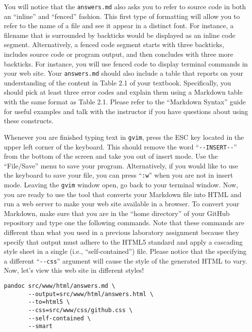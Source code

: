 \documentclass[11pt]{article}
\newcommand{\mainprogram}{\lstinline{answers.md}}
\newcommand{\command}[1]{``\lstinline{#1}''}
\newcommand{\program}[1]{\lstinline{#1}}
\newcommand{\option}[1]{``{#1}''}
\begin{document}
You will notice that the \mainprogram{} also asks you to refer to source code
in both an ``inline'' and ``fenced'' fashion. This first type of formatting
will allow you to refer to the name of a file and see it appear in a distinct
font. For instance, a filename that is surrounded by backticks would be
displayed as an inline code segment. Alternatively, a fenced code segment
starts with three backticks, includes source code or program output, and then
concludes with three more backticks. For instance, you will use fenced code to
display terminal commands in your web site. Your \mainprogram{} should also
include a table that reports on your understanding of the content in Table 2.1
of your textbook. Specifically, you should pick at least three error codes and
explain them using a Markdown table with the same format as Table 2.1. Please
refer to the ``Markdown Syntax'' guide for useful examples and talk with the
instructor if you have questions about using these constructs.

Whenever you are finished typing text in \program{gvim}, press the ESC key
located in the upper left corner of the keyboard. This should remove the word
\command{--INSERT--} from the bottom of the screen and take you out of insert
mode. Use the \option{File/Save} menu to save your program. Alternatively, if
you would like to use the keyboard to save your file, you can press
\command{:w} when you are not in insert mode. Leaving the {\tt gvim} window
open, go back to your terminal window. Now, you are ready to use the tool that
converts your Markdown file into HTML and run a web server to make your web
site available in a browser. To convert your Markdown, make sure that you are
in the ``home directory'' of your GitHub repository and type one the following
commands. Note that these commands are different than what you used in a
previous laboratory assignment because they specify that output must adhere to
the HTML5 standard and apply a cascading style sheet in a single (i.e.,
``self-contained'') file. Please notice that the specifying a different
\command{--css} argument will cause the style of the generated HTML to vary.
Now, let's view this web site in different styles!

\vspace*{-.05in}

\begin{verbatim}
pandoc src/www/html/answers.md \
       --output=src/www/html/answers.html \
       --to=html5 \
       --css=src/www/css/github.css \
       --self-contained \
       --smart
\end{verbatim}
\end{document}
